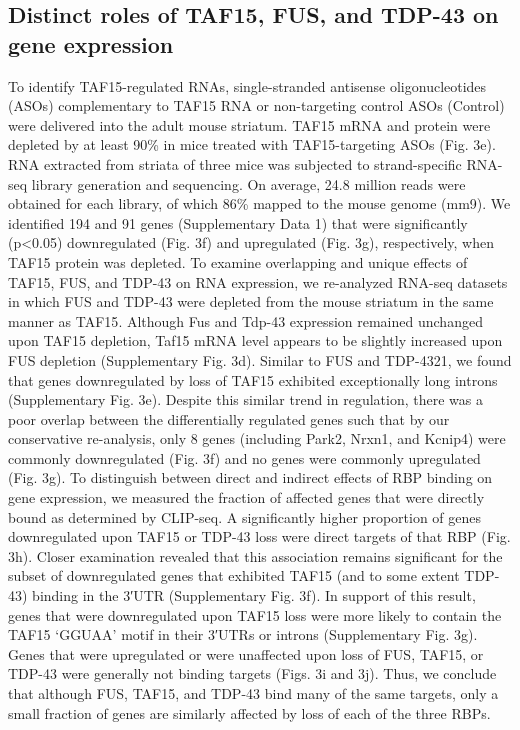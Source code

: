 \subsection{Distinct roles of TAF15, FUS, and TDP-43 on gene expression}
To identify TAF15-regulated RNAs, single-stranded antisense oligonucleotides (ASOs) complementary to TAF15 RNA or non-targeting control ASOs (Control) were delivered into the adult mouse striatum. TAF15 mRNA and protein were depleted by at least 90\% in mice treated with TAF15-targeting ASOs (Fig. 3e). RNA extracted from striata of three mice was subjected to strand-specific RNA-seq library generation and sequencing. On average, 24.8 million reads were obtained for each library, of which 86\% mapped to the mouse genome (mm9). We identified 194 and 91 genes (Supplementary Data 1) that were significantly (p<0.05) downregulated (Fig. 3f) and upregulated (Fig. 3g), respectively, when TAF15 protein was depleted. To examine overlapping and unique effects of TAF15, FUS, and TDP-43 on RNA expression, we re-analyzed RNA-seq datasets in which FUS and TDP-43 were depleted from the mouse striatum in the same manner as TAF15\cite{Lagier-Tourenne2012,Polymenidou2011}. Although Fus and Tdp-43 expression remained unchanged upon TAF15 depletion, Taf15 mRNA level appears to be slightly increased upon FUS depletion (Supplementary Fig. 3d). Similar to FUS and TDP-4321, we found that genes downregulated by loss of TAF15 exhibited exceptionally long introns (Supplementary Fig. 3e). Despite this similar trend in regulation, there was a poor overlap between the differentially regulated genes such that by our conservative re-analysis, only 8 genes (including Park2, Nrxn1, and Kcnip4) were commonly downregulated (Fig. 3f) and no genes were commonly upregulated (Fig. 3g). To distinguish between direct and indirect effects of RBP binding on gene expression, we measured the fraction of affected genes that were directly bound as determined by CLIP-seq. A significantly higher proportion of genes downregulated upon TAF15 or TDP-43 loss were direct targets of that RBP (Fig. 3h). Closer examination revealed that this association remains significant for the subset of downregulated genes that exhibited TAF15 (and to some extent TDP-43) binding in the 3′UTR (Supplementary Fig. 3f). In support of this result, genes that were downregulated upon TAF15 loss were more likely to contain the TAF15 ‘GGUAA’ motif in their 3′UTRs or introns (Supplementary Fig. 3g). Genes that were upregulated or were unaffected upon loss of FUS, TAF15, or TDP-43 were generally not binding targets (Figs. 3i and 3j). Thus, we conclude that although FUS, TAF15, and TDP-43 bind many of the same targets, only a small fraction of genes are similarly affected by loss of each of the three RBPs.

